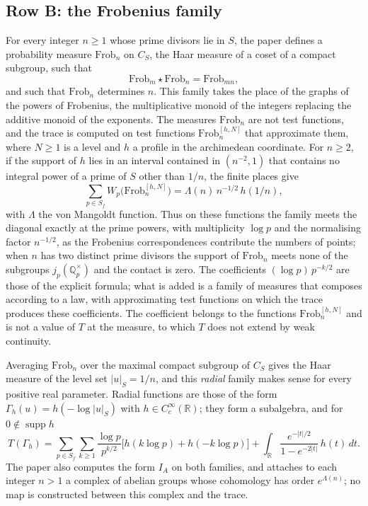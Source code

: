 \documentclass[10pt]{amsart}
\theoremstyle{definition}
\theoremstyle{remark}
\newcommand{\R}{\mathbb R}
\newcommand{\Q}{\mathbb Q}
\newcommand{\Frob}{\mathrm{Frob}}
\begin{document}
\subsection{Row B: the Frobenius family}
For every integer $n\ge1$ whose prime divisors lie in $S$, the paper \cite{P44} defines a
probability measure $\Frob_n$ on $C_S$, the Haar measure of a coset of a compact subgroup, such
that
\[
 \Frob_m\star\Frob_n=\Frob_{mn},
\]
and such that $\Frob_n$ determines $n$. This family takes the place of the graphs of the powers
of Frobenius, the multiplicative monoid of the integers replacing the additive monoid of the
exponents. The measures $\Frob_n$ are not test functions, and the trace is computed on test
functions $\Frob_n^{[h,N]}$ that approximate them, where $N\ge1$ is a level and $h$ a profile in
the archimedean coordinate. For $n\ge2$, if the support of $h$ lies in an interval contained in
$(n^{-2},1)$ that contains no integral power of a prime of $S$ other than $1/n$, the finite places give
\begin{equation}\label{eq:contact}
 \sum_{p\in S_f}W_p\bigl(\Frob_n^{[h,N]}\bigr)=\Lambda(n)\,n^{-1/2}\,h(1/n),
\end{equation}
with $\Lambda$ the von Mangoldt function. Thus on these functions the family meets the diagonal
exactly at the prime powers, with multiplicity $\log p$ and the normalising factor $n^{-1/2}$,
as the Frobenius correspondences contribute the numbers of points; when $n$ has two distinct
prime divisors the support of $\Frob_n$ meets none of the subgroups $j_p(\Q_p^\times)$ and the
contact is zero. The coefficients $(\log p)\,p^{-k/2}$ are those of the explicit formula; what
is added is a family of measures that composes according to a law, with approximating test
functions on which the trace produces these coefficients. The coefficient belongs to the
functions $\Frob_n^{[h,N]}$ and is not a value of $T$ at the measure, to which $T$ does not
extend by weak continuity.

Averaging $\Frob_n$ over the maximal compact subgroup of $C_S$ gives the Haar measure of the
level set $|u|_S=1/n$, and this \emph{radial} family makes sense for every positive real
parameter. Radial functions are those of the form $\Gamma_h(u)=h(-\log|u|_S)$ with
$h\in C_c^\infty(\R)$; they form a subalgebra, and for $0\notin\operatorname{supp}h$
\begin{equation}\label{eq:radtrace}
 T(\Gamma_h)=\sum_{p\in S_f}\sum_{k\ge1}\frac{\log p}{p^{k/2}}\bigl[h(k\log p)+h(-k\log p)\bigr]
 +\int_{\R}\frac{e^{-|t|/2}}{1-e^{-2|t|}}\,h(t)\,dt .
\end{equation}
The paper also computes the form $I_A$ on both families, and attaches to each integer $n>1$ a
complex of abelian groups whose cohomology has order $e^{\Lambda(n)}$; no map is constructed
between this complex and the trace.
\end{document}

